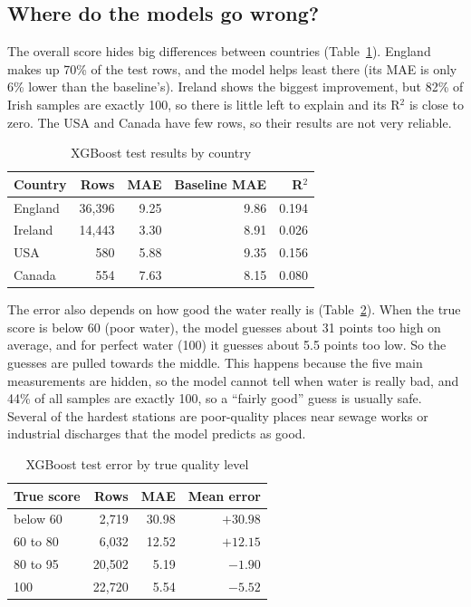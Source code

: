 \documentclass[11pt,a4paper]{article}
\begin{document}
\subsection{Where do the models go wrong?}
The overall score hides big differences between countries (Table~\ref{tab:country}). England makes up 70\% of the test rows, and the model helps least there (its MAE is only 6\% lower than the baseline's). Ireland shows the biggest improvement, but 82\% of Irish samples are exactly 100, so there is little left to explain and its R$^2$ is close to zero. The USA and Canada have few rows, so their results are not very reliable.
\begin{table}[H]\caption{XGBoost test results by country}\label{tab:country}\centering\small
\begin{tabular}{lrrrr}\toprule Country & Rows & MAE & Baseline MAE & R$^2$\\\midrule
England & 36,396 & 9.25 & 9.86 & 0.194\\
Ireland & 14,443 & 3.30 & 8.91 & 0.026\\
USA & 580 & 5.88 & 9.35 & 0.156\\
Canada & 554 & 7.63 & 8.15 & 0.080\\\bottomrule\end{tabular}\end{table}

The error also depends on how good the water really is (Table~\ref{tab:band}). When the true score is below 60 (poor water), the model guesses about 31 points too high on average, and for perfect water (100) it guesses about 5.5 points too low. So the guesses are pulled towards the middle. This happens because the five main measurements are hidden, so the model cannot tell when water is really bad, and 44\% of all samples are exactly 100, so a ``fairly good'' guess is usually safe. Several of the hardest stations are poor-quality places near sewage works or industrial discharges that the model predicts as good.
\begin{table}[H]\caption{XGBoost test error by true quality level}\label{tab:band}\centering\small
\begin{tabular}{lrrr}\toprule True score & Rows & MAE & Mean error\\\midrule
below 60 & 2,719 & 30.98 & $+30.98$\\
60 to 80 & 6,032 & 12.52 & $+12.15$\\
80 to 95 & 20,502 & 5.19 & $-1.90$\\
100 & 22,720 & 5.54 & $-5.52$\\\bottomrule\end{tabular}\end{table}
\end{document}
